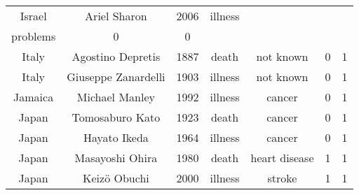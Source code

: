 \begin{center}
\begin{longtable}{ccccccc}
Israel                                                                     & Ariel Sharon                                                                          & 2006       & illness       & \begin{tabular}[c]{@{}c@{}}circulatory\\ problems\end{tabular}         & 0        & 0       \\
Italy                                                                      & Agostino Depretis                                                                     & 1887       & death         & not known                                                              & 0        & 1       \\
Italy                                                                      & Giuseppe Zanardelli                                                                   & 1903       & illness       & not known                                                              & 0        & 1       \\
Jamaica                                                                    & Michael Manley                                                                        & 1992       & illness       & cancer                                                                 & 0        & 1       \\
Japan                                                                      & Tomosaburo Kato                                                                       & 1923       & death         & cancer                                                                 & 0        & 1       \\
Japan                                                                      & Hayato Ikeda                                                                          & 1964       & illness       & cancer                                                                 & 0        & 1       \\
Japan                                                                      & Masayoshi Ohira                                                                       & 1980       & death         & heart disease                                                          & 1        & 1       \\
Japan                                                                      & Keizö Obuchi                                                                          & 2000       & illness       & stroke                                                                 & 1        & 1       \\

\end{longtable}
\end{center}
